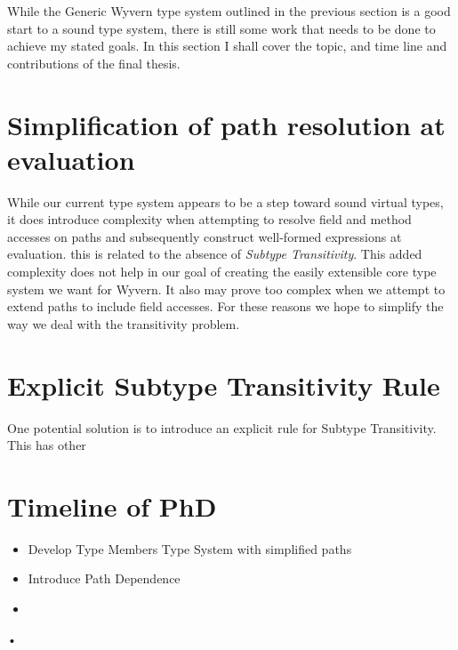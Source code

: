 \documentclass[11pt
              , a4paper
              , twoside
              , openright
              ]{report}
\numberwithin{case}{theorem}
\numberwithin{subcase}{case}
\begin{document}
While the Generic Wyvern type system outlined in the previous section is a good start to a sound type system, there is still some work that needs to be done to achieve my stated goals. In this section I shall cover the topic, and time line and contributions of the final thesis.

\section{Simplification of path resolution at evaluation}
While our current type system appears to be a step toward sound virtual types, it does introduce complexity when attempting to resolve field and method accesses on paths and subsequently construct well-formed expressions at evaluation. this is related to the absence of \emph{Subtype Transitivity}. This added complexity does not help in our goal of creating the easily extensible core type system we want for Wyvern. It also may prove too complex when we attempt to extend paths to include field accesses. For these reasons we hope to simplify the way we deal with the transitivity problem.

\section{Explicit Subtype Transitivity Rule}
One potential solution is to introduce an explicit rule for Subtype Transitivity. This has other

\section{Timeline of PhD}
\begin{itemize}
\item
Develop Type Members Type System with simplified paths
\item
Introduce Path Dependence
\item

\end{itemize}•



\backmatter



%


\end{document}
